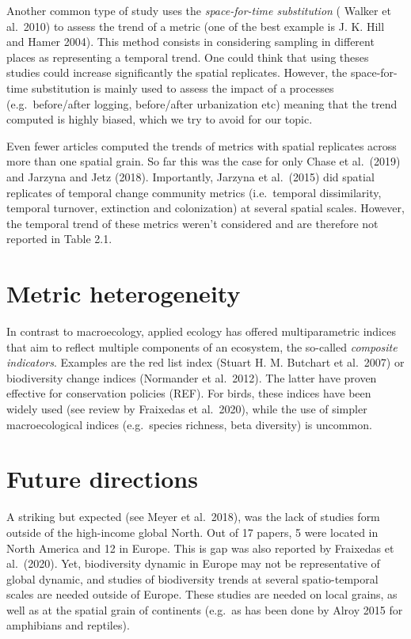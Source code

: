 \documentclass[
  12pt,
  oneside]{report}
\begin{document}
Another common type of study uses the \emph{space-for-time substitution} ( Walker et al.~2010) to assess the trend of a metric (one of the best example is J. K. Hill and Hamer 2004). This method consists in considering sampling in different places as representing a temporal trend. One could think that using theses studies could increase significantly the spatial replicates. However, the space-for-time substitution is mainly used to assess the impact of a processes (e.g.~before/after logging, before/after urbanization etc) meaning that the trend computed is highly biased, which we try to avoid for our topic.

Even fewer articles computed the trends of metrics with spatial replicates across more than one spatial grain. So far this was the case for only Chase et al.~(2019) and Jarzyna and Jetz (2018). Importantly, Jarzyna et al.~(2015) did spatial replicates of temporal change community metrics (i.e.~temporal dissimilarity, temporal turnover, extinction and colonization) at several spatial scales. However, the temporal trend of these metrics weren't considered and are therefore not reported in Table 2.1.

\hypertarget{metric-heterogeneity}{%
\chapter{Metric heterogeneity}\label{metric-heterogeneity}}

In contrast to macroecology, applied ecology has offered multiparametric indices that aim to reflect multiple components of an ecosystem, the so-called \emph{composite indicators}. Examples are the red list index (Stuart H. M. Butchart et al.~2007) or biodiversity change indices (Normander et al.~2012). The latter have proven effective for conservation policies (REF). For birds, these indices have been widely used (see review by Fraixedas et al.~2020), while the use of simpler macroecological indices (e.g.~species richness, beta diversity) is uncommon.

\hypertarget{future-directions}{%
\chapter{Future directions}\label{future-directions}}

A striking but expected (see Meyer et al.~2018), was the lack of studies form outside of the high-income global North. Out of 17 papers, 5 were located in North America and 12 in Europe. This is gap was also reported by Fraixedas et al.~(2020). Yet, biodiversity dynamic in Europe may not be representative of global dynamic, and studies of biodiversity trends at several spatio-temporal scales are needed outside of Europe. These studies are needed on local grains, as well as at the spatial grain of continents (e.g.~as has been done by Alroy 2015 for amphibians and reptiles).
\end{document}
